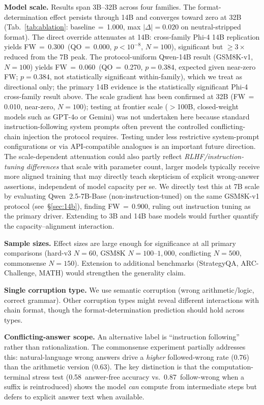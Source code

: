\documentclass{article}
\theoremstyle{definition}
\theoremstyle{definition}
\newcommand{\CCFW}{0.63}
\newcommand{\CTCCFW}{0.87}
\newcommand{\CTCTACC}{0.58}
\newcommand{\CSCCFW}{0.76}
\newcommand{\PHIFOURCCFW}{0.300}
\newcommand{\PHIFOURQOACC}{0.000}
\newcommand{\PHIFOURCCPVAL}{$p{<}10^{-8}$}
\newcommand{\PHIFOURN}{100}
\newcommand{\QWTBCCFW}{0.010}
\newcommand{\QWTBN}{100}
\newcommand{\QBVONEFW}{0.060}
\newcommand{\QBVONEQOACC}{0.270}
\newcommand{\QBVONEN}{100}
\newcommand{\QBVONEPVAL}{$p{=}0.384$}
\newcommand{\QBASEVONEFW}{0.900}
\begin{document}
\textbf{Model scale.}
Results span 3B--32B across four families. The format-determination
effect persists through 14B and converges toward zero at 32B
(Tab.~\ref{tab:ablation}: baseline$\,=\,$1.000, max $|\Delta|{=}0.020$
on neutral-stripped format). The direct override attenuates at 14B:
cross-family Phi-4 14B replication yields FW\,$=$\,\PHIFOURCCFW\
(QO\,$=$\,\PHIFOURQOACC, \PHIFOURCCPVAL, $N{=}\PHIFOURN$), significant
but $\geq{}3{\times}$ reduced from the 7B peak.
The protocol-uniform Qwen-14B result (GSM8K-v1, $N{=}\QBVONEN$) yields
FW\,$=$\,\QBVONEFW\ (QO\,$=$\,\QBVONEQOACC, \QBVONEPVAL, expected
given near-zero FW; $p{=}0.384$, not statistically significant within-family),
which we treat as directional only; the primary 14B evidence is the statistically significant Phi-4 cross-family result above.
The scale gradient has been confirmed at 32B (FW\,$=$\,\QWTBCCFW,
near-zero, $N{=}\QWTBN$); testing at frontier scale ($>$100B,
closed-weight models such as GPT-4o or Gemini) was not undertaken
here because standard instruction-following system prompts often
prevent the controlled conflicting-chain injection the protocol requires.
Testing under less restrictive system-prompt configurations or via
API-compatible analogues is an important future direction.
The scale-dependent attenuation could also partly reflect \emph{RLHF/instruction-tuning
differences} that scale with parameter count, larger models typically receive more
aligned training that may directly teach skepticism of explicit wrong-answer assertions,
independent of model capacity per se. We directly test this at 7B scale by evaluating Qwen~2.5-7B-Base (non-instruction-tuned) on the same GSM8K-v1 protocol (see~\S\ref{sec:14b}), finding FW\,$=$\,\QBASEVONEFW, ruling out instruction tuning as the primary driver. Extending to 3B and 14B base models would further quantify the capacity--alignment interaction.

\textbf{Sample sizes.}
Effect sizes are large enough for significance at all primary comparisons
(hard-v3 $N{=}60$, GSM8K $N{=}100$--$1{,}000$, conflicting $N{=}500$,
commonsense $N{=}150$). Extension to additional benchmarks (StrategyQA,
ARC-Challenge, MATH) would strengthen the generality claim.

\textbf{Single corruption type.}
We use semantic corruption (wrong arithmetic/logic, correct grammar).
Other corruption types might reveal different interactions with chain
format, though the format-determination prediction should hold across
types.

\textbf{Conflicting-answer scope.}
An alternative label is ``instruction following'' rather than
rationalization. The commonsense experiment partially addresses this:
natural-language wrong answers drive a \emph{higher} followed-wrong
rate (\CSCCFW) than the arithmetic version (\CCFW). The key distinction
is that the computation-terminal stress test (\CTCTACC\ answer-free
accuracy vs.\ \CTCCFW\ follow-wrong when a suffix is reintroduced)
shows the model \emph{can} compute from intermediate steps but defers
to explicit answer text when available.
\end{document}
